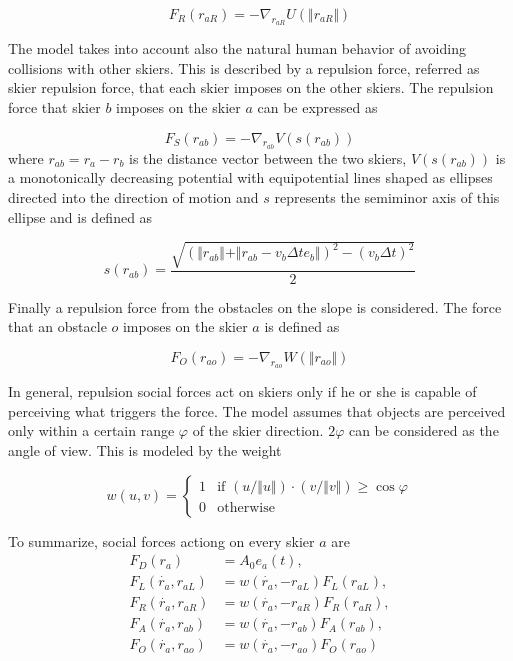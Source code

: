 \documentclass[12pt,a4paper,twoside]{book}
\begin{document}
\begin{equation}\label{right_force}
F_R(r_{aR})=-\nabla_{r_{aR}}U(\Vert r_{aR} \Vert )
\end{equation}

The model takes into account also the natural human behavior of avoiding collisions with other skiers. This is described by a repulsion force, referred as skier repulsion force, that each skier imposes on the other skiers. The repulsion force that skier $b$ imposes on the skier $a$ can be expressed as

\begin{equation}\label{skier_force}
F_S(r_{ab})=-\nabla_{r_{ab}}V(s(r_{ab}))
\end{equation}
where $r_{ab}=r_a-r_b$ is the distance vector between the two skiers, $V(s(r_{ab}))$ is a monotonically decreasing potential with equipotential lines shaped as ellipses directed into the direction of motion and $s$ represents the semiminor axis of this ellipse and is defined as

\begin{equation}\label{skier_s}
s(r_{ab})=\frac{\sqrt{(\Vert r_{ab} \Vert + \Vert r_{ab}-v_b \Delta t e_b \Vert )^2-(v_b \Delta t)^2}}{2}
\end{equation}

Finally a repulsion force from the obstacles on the slope is considered. The force that an obstacle $o$ imposes on the skier $a$ is defined as

\begin{equation}\label{obstacle_force}
F_O(r_{ao})=-\nabla_{r_{ao}}W(\Vert r_{ao} \Vert )
\end{equation}

In general, repulsion social forces act on skiers only if he or she is capable of perceiving what triggers the force. The model assumes that objects are perceived only within a certain range $\varphi$ of the skier direction. $2\varphi$ can be considered as the angle of view. This is modeled by the weight

\begin{equation}\label{visibility}
w(u,v)=\begin{cases}
  1 & \text{if $(u/\Vert u \Vert)\cdot (v/\Vert v \Vert) \geq \cos \varphi$} \\
  0 & \text{otherwise }
  \end{cases}
\end{equation}

To summarize, social forces actiong on every skier $a$ are
\begin{align}\label{social_forces_tb}
F_D(r_a)&=A_0 e_a(t),\\
F_L(\dot{r_a},r_{aL})&=w(\dot{r_a},-r_{aL})F_L(r_{aL}),\\
F_R(\dot{r_a},r_{aR})&=w(\dot{r_a},-r_{aR})F_R(r_{aR}),\\
F_A(\dot{r_a},r_{ab})&=w(\dot{r_a},-r_{ab})F_A(r_{ab}),\\
F_O(\dot{r_a},r_{ao})&=w(\dot{r_a},-r_{ao})F_O(r_{ao})
\end{align}
\end{document}
